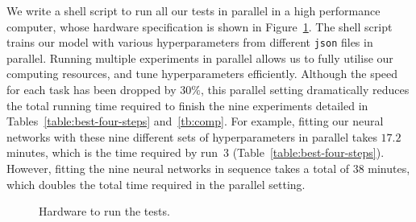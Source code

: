 We write a shell script to run all our tests in parallel in a high performance computer, whose hardware specification is shown in Figure~\ref{fig:hardware}. The shell script trains our model with various hyperparameters from different 
\texttt{json} files in parallel. 
Running multiple experiments in parallel allows us to fully utilise our computing resources, and tune hyperparameters efficiently. Although the speed for each task has been dropped by $30\%$, this parallel setting dramatically reduces the total running time required to finish the nine experiments detailed in Tables~\ref{table:best-four-steps} and~\ref{tb:comp}. For example, fitting our neural networks with these nine different sets of hyperparameters in parallel takes $17.2$ minutes, which is the time required by run~3 (Table~\ref{table:best-four-steps}). However, fitting the nine neural networks in sequence takes a total of $38$ minutes, which doubles the total time required in the parallel setting. 




\begin{figure}
    \caption{Hardware to run the tests.}
    \label{fig:hardware}
\end{figure}




